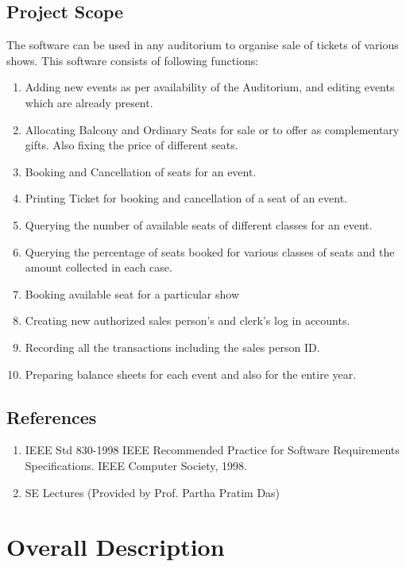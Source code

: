 \documentclass{scrreprt}
\begin{document}
\section{Project Scope}
The software can be used in any auditorium to organise sale of tickets of various shows. This software consists of following functions:
\begin{enumerate}
	\item Adding new events as per availability of the Auditorium, and editing events which are already present.
	\item Allocating Balcony and Ordinary Seats for sale or to offer as complementary gifts. Also fixing the price of different seats.
	\item Booking and Cancellation of seats for an event.
	\item Printing Ticket for booking and cancellation of a seat of an event.
	\item Querying the number of available seats of different classes for an event.
	\item Querying the percentage of seats booked for various classes of seats and the amount collected in each case.
	\item Booking available seat for a particular show
	\item Creating new authorized sales person’s and clerk’s log in accounts.
	\item Recording all the transactions including the sales person ID.
	\item Preparing balance sheets for each event and also for the entire year.
\end{enumerate}

\section{References}
\begin{enumerate}
	\item IEEE Std 830-1998 IEEE Recommended Practice for Software Requirements Specifications. IEEE Computer Society, 1998.
	\item SE Lectures (Provided by Prof. Partha Pratim Das)
\end{enumerate}


\chapter{Overall Description}
\end{document}
